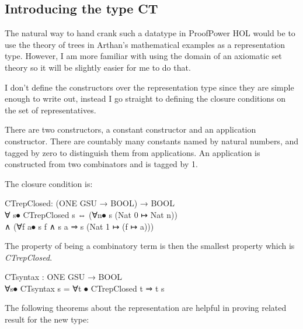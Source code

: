 \subsection{Introducing the type CT}

The natural way to hand crank such a datatype in ProofPower HOL would be to use the theory of trees in Arthan's mathematical examples as a representation type.
However, I am more familiar with using the domain of an axiomatic set theory so it will be slightly easier for me to do that.

I don't define the constructors over the representation type since they are simple enough to write out, instead I go straight to defining the closure conditions on the set of representatives.

There are two constructors, a constant constructor and an application constructor.
There are countably many constants named by natural numbers, and tagged by zero to distinguish them from applications.
An application is constructed from two combinators and is tagged by 1.

The closure condition is:

\begin{HOLConst}
\+\PrNM{} \PrNL{}CTrepClosed\PrNN{}: (ONE GSU → BOOL) → BOOL\\
\PrPH{}\PrPM{}\PrPM{}\PrPM{}\PrPM{}\PrPM{}\PrPM{}\PrPM{}\PrPM{}\PrPM{}\PrPM{}\PrPM{}
\+\PrNM{} ∀ s⦁ CTrepClosed s ⇔ (∀n⦁ s (Nat 0 ↦ Nat n))\\
\+\PrNM{}	∧ (∀f a⦁ s f ∧ s a ⇒ s (Nat 1 ↦ (f ↦ a)))\\
\end{HOLConst}

The property of being a combinatory term is then the smallest property which is \emph{CTrepClosed}.

\begin{HOLConst}
\+\PrNM{} \PrNL{}CTsyntax\PrNN{} : ONE GSU → BOOL\\
\PrPH{}\PrPM{}\PrPM{}\PrPM{}\PrPM{}\PrPM{}\PrPM{}\PrPM{}\PrPM{}\PrPM{}\PrPM{}\PrPM{}
\+\PrNM{} ∀s⦁ CTsyntax s = ∀t ⦁ CTrepClosed t ⇒ t s\\
\end{HOLConst}

The following theorems about the representation are helpful in proving related result for the new type:

